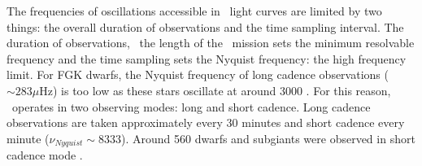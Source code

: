 
The frequencies of oscillations accessible in \kepler\ light curves are
limited by two things: the overall duration of observations and the time
sampling interval.
The duration of observations, \ie\ the length of the \kepler\ mission sets the
minimum resolvable frequency and the time sampling sets the Nyquist frequency:
the high frequency limit.
For FGK dwarfs, the Nyquist frequency of long cadence observations ($\sim 283
\mu$Hz) is too low as these stars oscillate at around 3000 \uHz.
For this reason, \kepler\ operates in two observing modes: long and short
cadence.
Long cadence observations are taken approximately every 30 minutes and short
cadence every minute ($\nu_{Nyquist} \sim 8333$\uHz).
Around 560 dwarfs and subgiants were observed in short cadence mode
\citep{Chaplin2014}.

